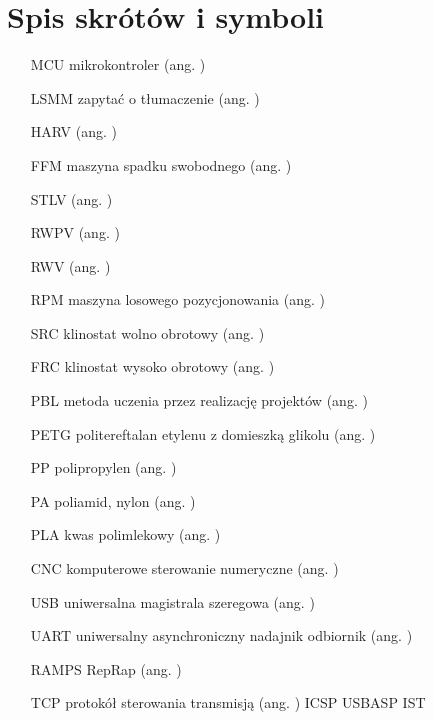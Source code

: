 \chapter*{Spis skrótów i symboli}

\begin{itemize}
	\item[MCU] mikrokontroler (ang. )
	\item[LSMM] zapytać o tłumaczenie  (ang. )
	\item[HARV]   ({ang. })
	\item[FFM] maszyna spadku swobodnego ({ang. })
	\item[STLV]  ({ang. })
	\item[RWPV]  ({ang. })
	\item[RWV]  ({ang. })
	\item[RPM] maszyna losowego pozycjonowania ({ang. })
	\item[SRC] klinostat wolno obrotowy ({ang. })
	\item[FRC] klinostat wysoko obrotowy  ({ang. })
	\item[PBL] metoda uczenia przez realizację projektów   ({ang. })
	\item[PETG] politereftalan etylenu z domieszką glikolu  ({ang. })
	\item[PP] polipropylen ({ang. })
	\item[PA] poliamid, nylon ({ang. })
	\item[PLA] kwas polimlekowy ({ang. })
	\item[CNC] komputerowe sterowanie numeryczne ({ang. })
	\item[USB] uniwersalna magistrala szeregowa ({ang. })
	\item[UART] uniwersalny asynchroniczny nadajnik odbiornik ({ang. })
	\item[RAMPS] RepRap   ({ang. })
	\item[TCP] protokół sterowania transmisją ({ang. })
	ICSP
	USBASP
	IST
\end{itemize}
